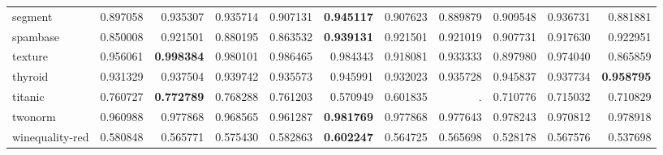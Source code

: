 \begin{tabular}{lrrrrrrrrrr}
segment         &   0.897058 &  0.935307 &  0.935714 &  0.907131 &  \textbf{0.945117} &  0.907623 &  0.889879 &  0.909548 &  0.936731 &  0.881881 \\
spambase        &   0.850008 &  0.921501 &  0.880195 &  0.863532 &  \textbf{0.939131} &  0.921501 &  0.921019 &  0.907731 &  0.917630 &  0.922951 \\
texture         &   0.956061 &  \textbf{0.998384} &  0.980101 &  0.986465 &  0.984343 &  0.918081 &  0.933333 &  0.897980 &  0.974040 &  0.865859 \\
thyroid         &   0.931329 &  0.937504 &  0.939742 &  0.935573 &  0.945991 &  0.932023 &  0.935728 &  0.945837 &  0.937734 &  \textbf{0.958795} \\
titanic         &   0.760727 &  \textbf{0.772789} &  0.768288 &  0.761203 &  0.570949 &  0.601835 &       .   &  0.710776 &  0.715032 &  0.710829 \\
twonorm         &   0.960988 &  0.977868 &  0.968565 &  0.961287 &  \textbf{0.981769} &  0.977868 &  0.977643 &  0.978243 &  0.970812 &  0.978918 \\
winequality-red &   0.580848 &  0.565771 &  0.575430 &  0.582863 &  \textbf{0.602247} &  0.564725 &  0.565698 &  0.528178 &  0.567576 &  0.537698 \\
\bottomrule
\end{tabular}
